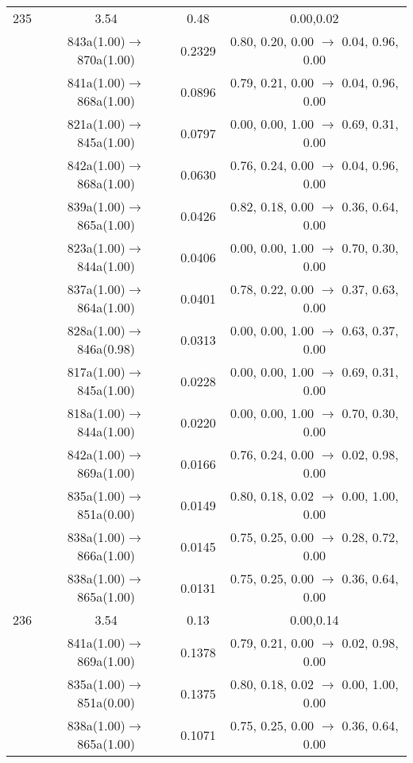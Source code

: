 \documentclass[10pt,a4paper]{article}
\begin{document}
\begin{longtable}{c|c|c|c}
 \hline235 &	 3.54 &	 0.48 &	 0.00,0.02 \\ 
  	& 843a(1.00)$\rightarrow$870a(1.00) &	 0.2329 &	 0.80, 0.20, 0.00 $\rightarrow$ 0.04, 0.96, 0.00 \\ 
 	& 841a(1.00)$\rightarrow$868a(1.00) &	 0.0896 &	 0.79, 0.21, 0.00 $\rightarrow$ 0.04, 0.96, 0.00 \\ 
 	& 821a(1.00)$\rightarrow$845a(1.00) &	 0.0797 &	 0.00, 0.00, 1.00 $\rightarrow$ 0.69, 0.31, 0.00 \\ 
 	& 842a(1.00)$\rightarrow$868a(1.00) &	 0.0630 &	 0.76, 0.24, 0.00 $\rightarrow$ 0.04, 0.96, 0.00 \\ 
 	& 839a(1.00)$\rightarrow$865a(1.00) &	 0.0426 &	 0.82, 0.18, 0.00 $\rightarrow$ 0.36, 0.64, 0.00 \\ 
 	& 823a(1.00)$\rightarrow$844a(1.00) &	 0.0406 &	 0.00, 0.00, 1.00 $\rightarrow$ 0.70, 0.30, 0.00 \\ 
 	& 837a(1.00)$\rightarrow$864a(1.00) &	 0.0401 &	 0.78, 0.22, 0.00 $\rightarrow$ 0.37, 0.63, 0.00 \\ 
 	& 828a(1.00)$\rightarrow$846a(0.98) &	 0.0313 &	 0.00, 0.00, 1.00 $\rightarrow$ 0.63, 0.37, 0.00 \\ 
 	& 817a(1.00)$\rightarrow$845a(1.00) &	 0.0228 &	 0.00, 0.00, 1.00 $\rightarrow$ 0.69, 0.31, 0.00 \\ 
 	& 818a(1.00)$\rightarrow$844a(1.00) &	 0.0220 &	 0.00, 0.00, 1.00 $\rightarrow$ 0.70, 0.30, 0.00 \\ 
 	& 842a(1.00)$\rightarrow$869a(1.00) &	 0.0166 &	 0.76, 0.24, 0.00 $\rightarrow$ 0.02, 0.98, 0.00 \\ 
 	& 835a(1.00)$\rightarrow$851a(0.00) &	 0.0149 &	 0.80, 0.18, 0.02 $\rightarrow$ 0.00, 1.00, 0.00 \\ 
 	& 838a(1.00)$\rightarrow$866a(1.00) &	 0.0145 &	 0.75, 0.25, 0.00 $\rightarrow$ 0.28, 0.72, 0.00 \\ 
 	& 838a(1.00)$\rightarrow$865a(1.00) &	 0.0131 &	 0.75, 0.25, 0.00 $\rightarrow$ 0.36, 0.64, 0.00 \\ 
 \hline236 &	 3.54 &	 0.13 &	 0.00,0.14 \\ 
  	& 841a(1.00)$\rightarrow$869a(1.00) &	 0.1378 &	 0.79, 0.21, 0.00 $\rightarrow$ 0.02, 0.98, 0.00 \\ 
 	& 835a(1.00)$\rightarrow$851a(0.00) &	 0.1375 &	 0.80, 0.18, 0.02 $\rightarrow$ 0.00, 1.00, 0.00 \\ 
 	& 838a(1.00)$\rightarrow$865a(1.00) &	 0.1071 &	 0.75, 0.25, 0.00 $\rightarrow$ 0.36, 0.64, 0.00 \\ 

\end{longtable}
\end{document}
